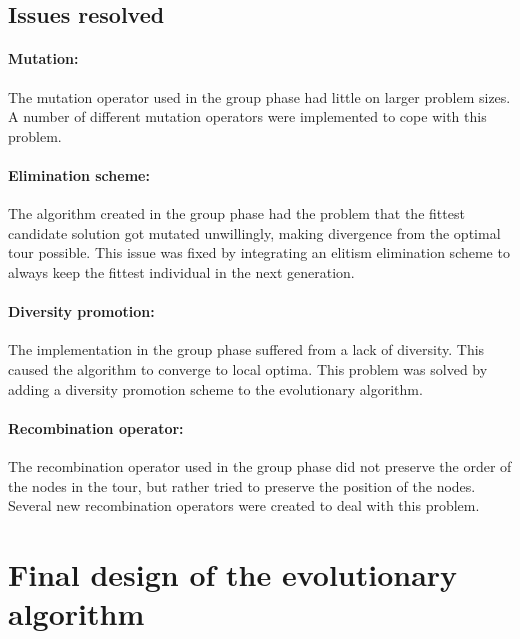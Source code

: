 \documentclass[a4paper,10pt]{article}
\newcommand{\ReplaceMe}[1]{{\color{blue}#1}}
\newcommand{\RemoveMe}[1]{{\color{purple}#1}}
\begin{document}
\subsection{Issues resolved}

\paragraph{Mutation:} The mutation operator used in the group phase had little on larger problem sizes. A number of different mutation operators were implemented to cope with this problem.

\paragraph{Elimination scheme:} The algorithm created in the group phase had the problem that the fittest candidate solution got mutated unwillingly, making divergence from the optimal tour possible. This issue was fixed by integrating an elitism elimination scheme to always keep the fittest individual in the next generation.

\paragraph{Diversity promotion:} The implementation in the group phase suffered from a lack of diversity. This caused the algorithm to converge to local optima. This problem was solved by adding a diversity promotion scheme to the evolutionary algorithm.

\paragraph{Recombination operator:} The recombination operator used in the group phase did not preserve the order of the nodes in the tour, but rather tried to preserve the position of the nodes. Several new recombination operators were created to deal with this problem.

\section{Final design of the evolutionary algorithm}  \label{sec:evolutionary algorithm}

\end{document}
